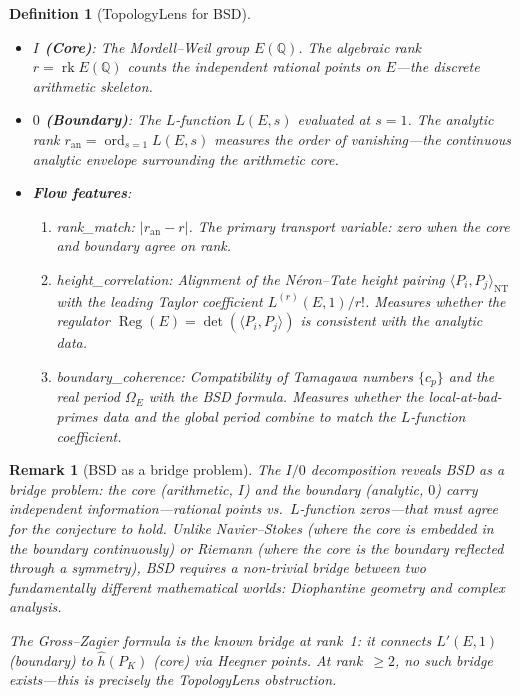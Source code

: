 \documentclass[11pt]{article}
\newtheorem{definition}[theorem]{Definition}
\newtheorem{remark}[theorem]{Remark}
\DeclareMathOperator{\rk}{rk}
\DeclareMathOperator{\ord}{ord}
\DeclareMathOperator{\Reg}{Reg}
\begin{document}
\begin{definition}[TopologyLens for BSD]
\label{def:topolens-bsd}
\mbox{}
\begin{itemize}
  \item \textbf{$I$ (Core)}: The Mordell--Weil group $E(\mathbb{Q})$.
    The algebraic rank $r = \rk E(\mathbb{Q})$ counts the independent rational
    points on $E$---the discrete arithmetic skeleton.

  \item \textbf{$0$ (Boundary)}: The $L$-function $L(E,s)$ evaluated at $s = 1$.
    The analytic rank $r_{\mathrm{an}} = \ord_{s=1} L(E,s)$ measures the order of
    vanishing---the continuous analytic envelope surrounding the arithmetic core.

  \item \textbf{Flow features}:
    \begin{enumerate}
      \item \emph{rank\_match}: $|r_{\mathrm{an}} - r|$.  The primary transport
        variable: zero when the core and boundary agree on rank.
      \item \emph{height\_correlation}: Alignment of the N\'eron--Tate height
        pairing $\langle P_i, P_j \rangle_{\mathrm{NT}}$ with the leading Taylor
        coefficient $L^{(r)}(E,1)/r!$.  Measures whether the regulator
        $\Reg(E) = \det(\langle P_i, P_j \rangle)$ is consistent with the
        analytic data.
      \item \emph{boundary\_coherence}: Compatibility of Tamagawa numbers
        $\{c_p\}$ and the real period $\Omega_E$ with the BSD formula.
        Measures whether the local-at-bad-primes data and the global period
        combine to match the $L$-function coefficient.
    \end{enumerate}
\end{itemize}
\end{definition}

\begin{remark}[BSD as a bridge problem]
The $I/0$ decomposition reveals BSD as a \emph{bridge problem}: the core
(arithmetic, $I$) and the boundary (analytic, $0$) carry independent
information---rational points vs.\ $L$-function zeros---that must agree for the
conjecture to hold.  Unlike Navier--Stokes (where the core is embedded in the
boundary continuously) or Riemann (where the core \emph{is} the boundary
reflected through a symmetry), BSD requires a non-trivial bridge between two
fundamentally different mathematical worlds: Diophantine geometry and complex
analysis.

The Gross--Zagier formula is the known bridge at rank~1: it connects
$L'(E,1)$ (boundary) to $\hat{h}(P_K)$ (core) via Heegner points.  At
rank~$\geq 2$, no such bridge exists---this is precisely the TopologyLens
obstruction.
\end{remark}
\end{document}

